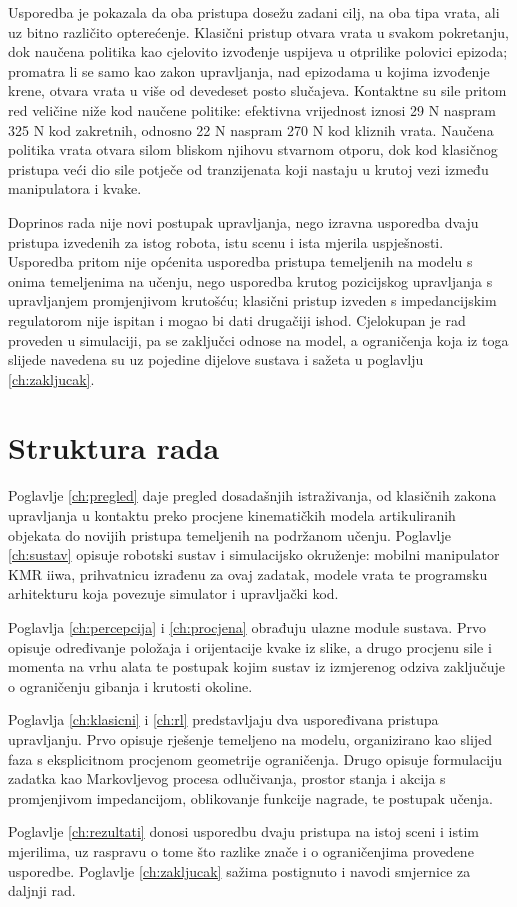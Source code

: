 Usporedba je pokazala da oba pristupa dosežu zadani cilj, na oba tipa vrata, ali uz bitno
različito opterećenje. Klasični pristup otvara vrata u svakom pokretanju, dok naučena politika
kao cjelovito izvođenje uspijeva u otprilike polovici epizoda; promatra li se samo kao zakon
upravljanja, nad epizodama u kojima izvođenje krene, otvara vrata u više od devedeset posto
slučajeva. Kontaktne su sile pritom red veličine niže kod naučene politike: efektivna vrijednost
iznosi 29 N naspram 325 N kod zakretnih, odnosno 22 N naspram 270 N kod kliznih vrata. Naučena
politika vrata otvara silom bliskom njihovu stvarnom otporu, dok kod klasičnog pristupa veći dio
sile potječe od tranzijenata koji nastaju u krutoj vezi između manipulatora i kvake.

Doprinos rada nije novi postupak upravljanja, nego izravna usporedba dvaju pristupa izvedenih za
istog robota, istu scenu i ista mjerila uspješnosti. Usporedba pritom nije općenita usporedba
pristupa temeljenih na modelu s onima temeljenima na učenju, nego usporedba krutog pozicijskog
upravljanja s upravljanjem promjenjivom krutošću; klasični pristup izveden s impedancijskim
regulatorom nije ispitan i mogao bi dati drugačiji ishod. Cjelokupan je rad proveden u simulaciji,
pa se zaključci odnose na model, a ograničenja koja iz toga slijede navedena su uz pojedine
dijelove sustava i sažeta u poglavlju \ref{ch:zakljucak}.

\section{Struktura rada}
\label{sec:struktura}

Poglavlje \ref{ch:pregled} daje pregled dosadašnjih istraživanja, od klasičnih zakona
upravljanja u kontaktu preko procjene kinematičkih modela artikuliranih objekata do novijih
pristupa temeljenih na podržanom učenju. Poglavlje \ref{ch:sustav} opisuje robotski sustav i
simulacijsko okruženje: mobilni manipulator KMR iiwa, prihvatnicu izrađenu za ovaj zadatak,
modele vrata te programsku arhitekturu koja povezuje simulator i upravljački kod.

Poglavlja \ref{ch:percepcija} i \ref{ch:procjena} obrađuju ulazne module sustava. Prvo opisuje
određivanje položaja i orijentacije kvake iz slike, a drugo procjenu sile i momenta na vrhu
alata te postupak kojim sustav iz izmjerenog odziva zaključuje o ograničenju gibanja i krutosti
okoline.

Poglavlja \ref{ch:klasicni} i \ref{ch:rl} predstavljaju dva uspoređivana pristupa upravljanju.
Prvo opisuje rješenje temeljeno na modelu, organizirano kao slijed faza s eksplicitnom procjenom
geometrije ograničenja. Drugo opisuje formulaciju zadatka kao Markovljevog procesa odlučivanja,
prostor stanja i akcija s promjenjivom impedancijom, oblikovanje funkcije nagrade, te postupak
učenja.

Poglavlje \ref{ch:rezultati} donosi usporedbu dvaju pristupa na istoj sceni i istim mjerilima,
uz raspravu o tome što razlike znače i o ograničenjima provedene usporedbe. Poglavlje
\ref{ch:zakljucak} sažima postignuto i navodi smjernice za daljnji rad.